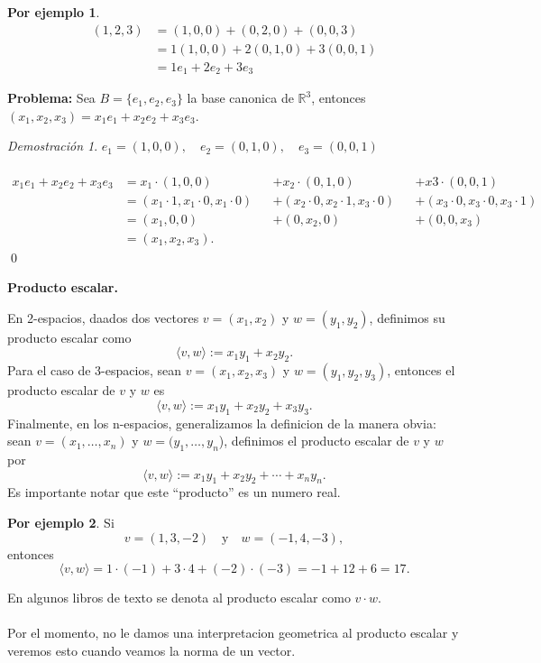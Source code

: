 \documentclass{article}
\theoremstyle{definition}
\theoremstyle{definition}
\newtheorem*{ej}{Por ejemplo}
\theoremstyle{remark}
\newtheorem*{demo}{Demostración}
\begin{document}
\begin{ej}
  \[
    \begin{aligned}
(1,2,3) &= (1,0,0)+(0,2,0)+(0,0,3) \\
        &= 1(1,0,0)+2(0,1,0)+3(0,0,1)\\
        &=1e_1+2e_2+3e_3
    \end{aligned}
  \]
\end{ej}\pagebreak
\textbf{Problema:}
  Sea $B=\{e_1,e_2,e_3\}$ la base canonica de $\mathbb{R}^3$, entonces \mbox{$(x_1,x_2,x_3)=x_1e_1+x_2e_2+x_3e_3$}.
\begin{demo} \;
$e_1=(1,0,0), \quad e_2=(0,1,0), \quad e_3=(0,0,1)$\\\\
\[
  \begin{aligned}
    x_1e_1+x_2e_2+x_3e_3 &=x_1\cdot(1,0,0)&&+x_2\cdot(0,1,0)&&+x3\cdot(0,0,1) \\
                         &= (x_1\cdot 1, x_1 \cdot 0, x_1 \cdot 0) &&+ (x_2 \cdot 0, x_2 \cdot 1 , x_3 \cdot 0 ) &&+ (x_3 \cdot 0, x_3 \cdot 0, x_3\cdot 1)\\
                         &= (x_1,0,0)&&+(0,x_2,0)&&+(0,0,x_3)\\
                         &= (x_1,x_2,x_3).
\end{aligned}\]\qed
\end{demo}
\begin{center}
\textbf{Producto escalar.}
\end{center}
En 2-espacios, daados dos vectores $v=(x_1,x_2)$ y $w=(y_1,y_2)$, definimos su producto escalar como \[
\langle v,w \rangle := x_1y_1+x_2y_2.
\]
Para el caso de 3-espacios, sean $v=(x_1,x_2,x_3)$ y $w=(y_1,y_2,y_3)$, entonces el producto escalar de $v$ y $w$ es \[
\langle v,w \rangle := x_1y_1 + x_2y_2 + x_3y_3.
\]
Finalmente, en los n-espacios, generalizamos la definicion de la manera obvia: sean $v=(x_1,\dots,x_n)$ y $w=(y_1,\dots,y_n$), definimos el producto escalar de $v$ y $w$ por \[
\langle v,w \rangle := x_1y_1 + x_2y_2 + \cdots + x_ny_n.
\]
Es importante notar que este ``producto'' es un numero real. \begin{ej}
  Si \[
    v=(1,3,-2) \quad \text{y} \quad w=(-1,4,-3),
  \]entonces
  \[
    \langle v,w \rangle = 1\cdot(-1)+3\cdot4+(-2)\cdot(-3)=-1+12+6=17.
  \]
\end{ej}
En algunos libros de texto se denota al producto escalar como $v \cdot w$. \\\\ Por el momento, no le damos una interpretacion geometrica al producto escalar y veremos esto cuando veamos la norma de un vector. \pagebreak
\end{document}
